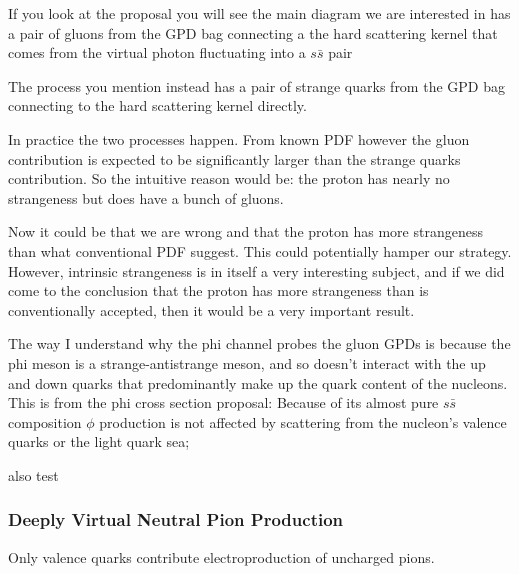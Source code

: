             If you look at the proposal you will see the main diagram we are interested in has a pair of gluons from the GPD bag connecting a the hard scattering kernel that comes from the virtual photon fluctuating into a $s\bar{s}$ pair
            
            The process you mention instead has a pair of strange quarks from the GPD bag connecting to the hard scattering kernel directly. 
            
            In practice the two processes happen. From known PDF however the gluon contribution is expected to be significantly larger than the strange quarks contribution. So the intuitive reason would be: the proton has nearly no strangeness but does have a bunch of gluons.
            
            Now it could be that we are wrong and that the proton has more strangeness than what conventional PDF suggest. This could potentially hamper our strategy. However, intrinsic strangeness is in itself a very interesting subject, and if we did come to the conclusion that the proton has more strangeness than is conventionally accepted, then it would be a very important result.
            
            The way I understand why the phi channel probes the gluon GPDs is because the phi meson is a strange-antistrange meson, and so doesn't interact with the up and down quarks that predominantly make up the quark content of the nucleons. This is from the phi cross section proposal: Because of its almost pure $s\bar{s}$ composition $\phi$ production is not affected by scattering from the nucleon’s valence quarks or the light quark sea;
            
          
    
    
        also \parencite{Diehl2020ExtractionKinematics}
        test \parencite{Burkardt2007GPDs0}
        
     
          
        \subsubsection*{Deeply Virtual Neutral Pion Production}

            Only valence quarks contribute electroproduction of uncharged pions.
    
           
            
